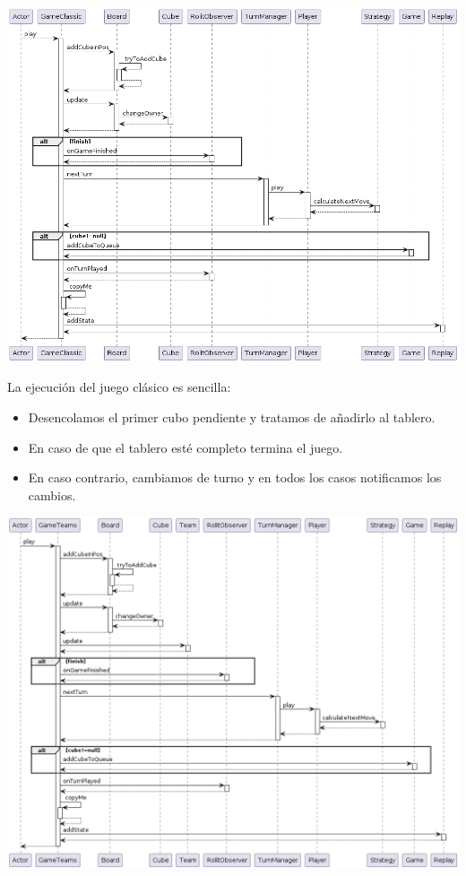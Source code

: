 \documentclass[../DocumentoOficial.tex]{subfiles}
\begin{document}
\begin{center}
\includegraphics[scale=0.45]{GameClassicPlay_final_seq}
\end{center} 

La ejecución del juego clásico es sencilla:
\begin{itemize}
\item Desencolamos el primer cubo pendiente y tratamos de añadirlo al tablero.
\item En caso de que el tablero esté completo termina el juego.
\item En caso contrario, cambiamos de turno y en todos los casos notificamos los cambios.
\end{itemize}
\newpage

\begin{center}
\includegraphics[scale=0.42]{GameTeams_final_seq}
\end{center}
\end{document}
